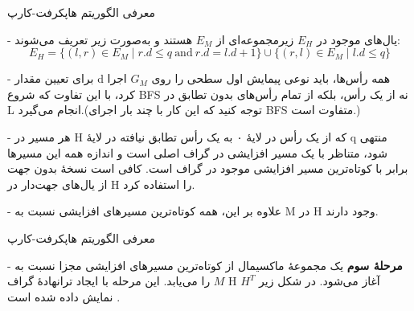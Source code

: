 \begin{itemframe}{‌معرفی الگوریتم هاپکرفت-کارپ}
\item[-]
یال‌های موجود در $E_H$ زیرمجموعه‌ای از $E_M$ هستند و به‌صورت زیر تعریف می‌شوند:
$$
E_H = \{ (l, r) \in E_M \mid r.d \leq q \ \text{and} \ r.d = l.d + 1 \} \cup \{ (r, l) \in E_M \mid l.d \leq q \}
$$

\item[-]
برای تعیین مقدار d همه رأس‌ها، باید نوعی پیمایش اول سطحی را روی $G_M$ اجرا کرد، با این تفاوت که شروع BFS نه از یک رأس، بلکه از تمام رأس‌های بدون تطابق در L انجام می‌گیرد.(توجه کنید که این کار با چند بار اجرای BFS متفاوت است.)
\item[-]
هر مسیر در H که از یک رأس در لایهٔ ۰ به یک رأس تطابق نیافته در لایهٔ q منتهی شود، متناظر با یک مسیر افزایشی در گراف اصلی است و اندازه همه این مسیرها برابر با کوتاه‌ترین مسیر افزایشی موجود در گراف است. کافی است نسخهٔ بدون جهت از یال‌های جهت‌دار در H را استفاده کرد.

\item[-]
علاوه بر این، همه کوتاه‌ترین مسیرهای افزایشی نسبت به M در H وجود دارند.
\end{itemframe}


\begin{itemframe}{‌معرفی الگوریتم هاپکرفت-کارپ}
\item[-]
\textbf{مرحلهٔ سوم}
یک مجموعهٔ ماکسیمال از کوتاه‌ترین مسیرهای افزایشی مجزا نسبت به $M$ را می‌یابد.
این مرحله با ایجاد ترانهادهٔ گراف H آغاز می‌شود. در شکل زیر $H^T$ نمایش داده شده است .
\end{itemframe}


